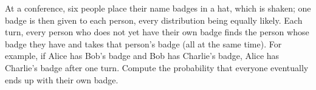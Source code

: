 At a conference, six people place their name badges in a hat, which is shaken; one badge is then given to each person, every distribution being equally likely. Each turn, every person who does not yet have their own badge finds the person whose badge they have and takes that person's badge (all at the same time). For example, if Alice has Bob's badge and Bob has Charlie's badge, Alice has Charlie's badge after one turn. Compute the probability that everyone eventually ends up with their own badge.
